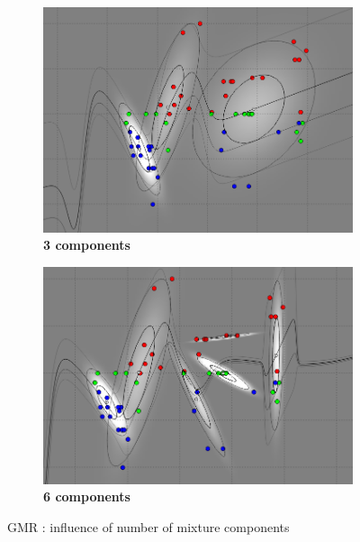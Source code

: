 \begin{figure}[!ht]
\centering
\begin{subfigure}[h]{0.45\textwidth}
\centering
\includegraphics[height=0.08\textheight]{./regression/full_cov_kmeans_3_mixture_100train.png}
\caption{\bf 3 components}
\end{subfigure}
\begin{subfigure}[h]{0.45\textwidth}
\centering
\includegraphics[height=0.08\textheight]{./regression/full_cov_kmeans_6_mixture_100train.png}
\caption{\bf 6 components}
\end{subfigure}

\caption{GMR : influence of number of mixture components}
\label{fig:number_mixture_components}
\end{figure}


